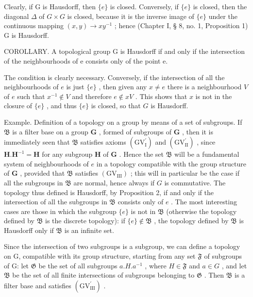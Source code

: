 Clearly, if G is Hausdorff, then \(\{e\}\) is closed. Conversely, if \(\{e\}\) is closed, then the diagonal \(\Delta\) of \(G \times G\) is closed, because it is the inverse image of \(\{e\}\) under the continuous mapping \((x, y) \to xy^{-1}\) ; hence (Chapter I, § 8, no. 1, Proposition 1) G is Hausdorff.

COROLLARY. A topological group G is Hausdorff if and only if the intersection of the neighbourhoods of e consists only of the point e.

The condition is clearly necessary. Conversely, if the intersection of all the neighbourhoods of \(e\) is just \(\{e\}\) , then given any \(x \neq e\) there is a neighbourhood \(V\) of \(e\) such that \(x^{-1} \notin V\) and therefore \(e \notin xV\) . This shows that \(x\) is not in the closure of \(\{e\}\) , and thus \(\{e\}\) is closed, so that \(G\) is Hausdorff.

Example. Definition of a topology on a group by means of a set of subgroups. If \(\mathfrak{B}\) is a filter base on a group \(\mathbf{G}\) , formed of subgroups of \(\mathbf{G}\) , then it is immediately seen that \(\mathfrak{B}\) satisfies axioms \((\mathrm{GV}_{\mathrm{I}}^{\prime})\) and \((\mathrm{GV}_{\mathrm{II}}^{\prime})\) , since \(\mathbf{H}.\mathbf{H}^{-1} = \mathbf{H}\) for any subgroup \(\mathbf{H}\) of \(\mathbf{G}\) . Hence the set \(\mathfrak{B}\) will be a fundamental system of neighbourhoods of \(e\) in a topology compatible with the group structure of \(\mathbf{G}\) , provided that \(\mathfrak{B}\) satisfies \((\mathrm{GV}_{\mathrm{III}})\) ; this will in particular be the case if all the subgroups in \(\mathfrak{B}\) are normal, hence always if \(G\) is commutative. The topology thus defined is Hausdorff, by Proposition 2, if and only if the intersection of all the subgroups in \(\mathfrak{B}\) consists only of \(e\) . The most interesting cases are those in which the subgroup \(\{e\}\) is not in \(\mathfrak{B}\) (otherwise the topology defined by \(\mathfrak{B}\) is the discrete topology): if \(\{e\} \notin \mathfrak{B}\) , the topology defined by \(\mathfrak{B}\) is Hausdorff only if \(\mathfrak{B}\) is an infinite set.

Since the intersection of two subgroups is a subgroup, we can define a topology on G, compatible with its group structure, starting from any set \(\mathfrak{F}\) of subgroups of G: let \(\mathfrak{G}\) be the set of all subgroups \(a.H.a^{-1}\) , where \(H\in\mathfrak{F}\) and \(a\in G\) , and let \(\mathfrak{B}\) be the set of all finite intersections of subgroups belonging to \(\mathfrak{G}\) . Then \(\mathfrak{B}\) is a filter base and satisfies \((\mathrm{GV}_{\mathrm{III}}^{\prime})\) .

